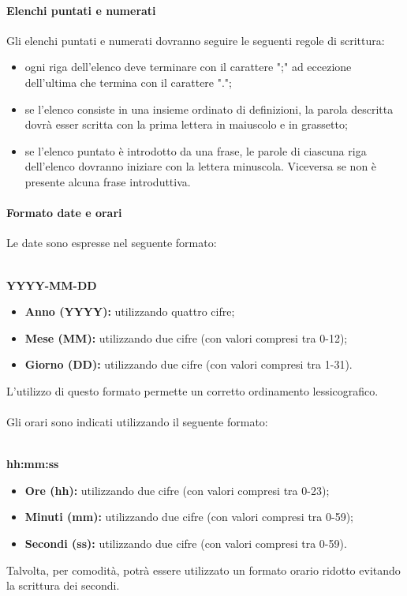   \paragraph{Elenchi puntati e numerati}
  Gli elenchi puntati e numerati dovranno seguire le seguenti regole di scrittura:
	\begin{itemize}
		\item ogni riga dell'elenco deve terminare con il carattere ";" ad eccezione dell'ultima che termina con il carattere ".";
		\item se l'elenco consiste in una insieme ordinato di definizioni, la parola descritta dovrà esser scritta con la prima lettera in maiuscolo e in grassetto;
		\item se l'elenco puntato è introdotto da una frase, le parole di ciascuna riga dell'elenco dovranno iniziare con la lettera minuscola. Viceversa se non è presente alcuna frase introduttiva. 
	\end{itemize}

  \paragraph{Formato date e orari}
  Le date sono espresse nel seguente formato:\\\\ 
  \centerline{\textbf{YYYY-MM-DD}} 
  \begin{itemize}
  	\item \textbf{Anno (YYYY):} utilizzando quattro cifre;
  	\item \textbf{Mese (MM):} utilizzando due cifre (con valori compresi tra 0-12);
  	\item \textbf{Giorno (DD):} utilizzando due cifre (con valori compresi tra 1-31).
  \end{itemize}
  L'utilizzo di questo formato permette un corretto ordinamento lessicografico.\\\\
  Gli orari sono indicati utilizzando il seguente formato:\\\\
  \centerline{\textbf{hh:mm:ss}} 
  \begin{itemize}
  	\item \textbf{Ore (hh):} utilizzando due cifre (con valori compresi tra 0-23);
  	\item \textbf{Minuti (mm):} utilizzando due cifre (con valori compresi tra 0-59);
  	\item \textbf{Secondi (ss):} utilizzando due cifre (con valori compresi tra 0-59).
  \end{itemize}
  Talvolta, per comodità, potrà essere utilizzato un formato orario ridotto evitando la scrittura dei secondi.
    
